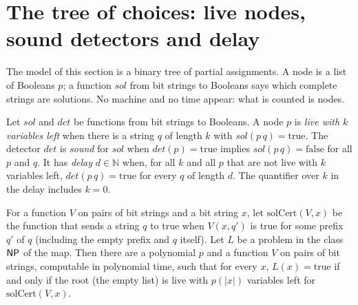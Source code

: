 \section{The tree of choices: live nodes, sound detectors and delay}
\label{sec:search-tree}

The model of this section is a binary tree of partial assignments. A node is a list of Booleans
$p$; a function $\mathit{sol}$ from bit strings to Booleans says which complete strings are
solutions. No machine and no time appear: what is counted is nodes.

\begin{definition}
  \label{def:search-vivo}
  \leanok
  Let $\mathit{sol}$ and $\mathit{det}$ be functions from bit strings to Booleans. A node $p$ is
  \emph{live with $k$ variables left} when there is a string $q$ of length $k$ with
  $\mathit{sol}(p\,q) = \mathrm{true}$. The detector $\mathit{det}$ is \emph{sound} for
  $\mathit{sol}$ when $\mathit{det}(p) = \mathrm{true}$ implies $\mathit{sol}(p\,q) = \mathrm{false}$
  for all $p$ and $q$. It has \emph{delay} $d \in \mathbb{N}$ when, for all $k$ and all $p$ that are
  not live with $k$ variables left, $\mathit{det}(p\,q) = \mathrm{true}$ for every $q$ of length $d$.
  The quantifier over $k$ in the delay includes $k = 0$.
  \own{}
\end{definition}

\begin{theorem}
  \label{thm:search-np-raiz-viva}
  \leanok
  For a function $V$ on pairs of bit strings and a bit string $x$, let $\mathrm{solCert}(V, x)$ be
  the function that sends a string $q$ to true when $V(x, q')$ is true for some prefix $q'$ of $q$
  (including the empty prefix and $q$ itself). Let $L$ be a problem in the class $\mathsf{NP}$ of the map.
  Then there are a polynomial $p$ and a function $V$ on pairs of bit strings, computable in
  polynomial time, such that for every $x$, $L(x) = \mathrm{true}$ if and only if the root (the empty
  list) is live with $p(|x|)$ variables left for $\mathrm{solCert}(V, x)$.
  \own{}
\end{theorem}


